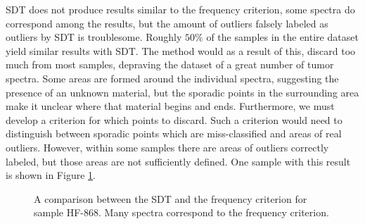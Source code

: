 SDT does not produce results similar to the frequency criterion, some spectra do correspond among the results, but the amount of outliers falsely labeled as outliers by SDT is troublesome. Roughly $50\%$ of the samples in the entire dataset yield similar results with SDT. The method would as a result of this, discard too much from most samples, depraving the dataset of a great number of tumor spectra. Some areas are formed around the individual spectra, suggesting the presence of an unknown material, but the sporadic points in the surrounding area make it unclear where that material begins and ends. Furthermore, we must develop a criterion for which points to discard. Such a criterion would need to distinguish between sporadic points which are miss-classified and areas of real outliers. However, within some samples there are areas of outliers correctly labeled, but those areas are not sufficiently defined. One sample with this result is shown in Figure \ref{fig:stdHF868}.

\begin{figure}[H]
    \centering
    \qquad
    \caption{A comparison between the SDT and the frequency criterion for sample HF-868. Many spectra correspond to the frequency criterion.
\label{fig:stdHF868}}%
\end{figure}

